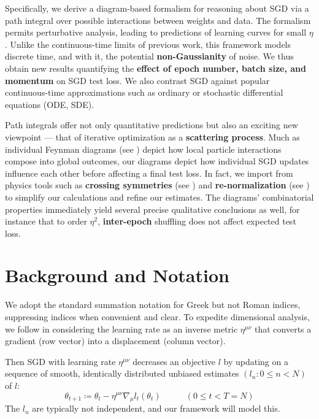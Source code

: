 \documentclass{article}
\begin{document}
    Specifically, we derive a diagram-based formalism for reasoning about SGD
    via a path integral over possible interactions between weights and data.
    The formalism permits perturbative analysis, leading to predictions of
    learning curves for small $\eta$.  Unlike the continuous-time limits of
    previous work, this framework models discrete time, and with it, the
    potential {\bf non-Gaussianity} of noise.  We thus obtain new results
    quantifying the {\bf effect of epoch number, batch size, and momentum} on
    SGD test loss.  We also contrast SGD against popular continuous-time
    approximations such as ordinary or stochastic differential equations (ODE,
    SDE).
    
    Path integrals offer not only quantitative predictions but also an exciting
    new viewpoint --- that of iterative optimization as a {\bf scattering
    process}.  Much as individual Feynman diagrams (see \citet{dy49a}) depict
    how local particle interactions compose into global outcomes, our diagrams
    depict how individual SGD updates influence each other before affecting a
    final test loss.  In fact, we import from physics tools such as {\bf
    crossing symmetries} (see \citet{dy49b}) and {\bf re-normalization} (see
    \citet{ge54}) to simplify our calculations and refine our estimates.
    The diagrams' combinatorial properties immediately yield several precise
    qualitative conclusions as well, for instance that to order $\eta^2$, {\bf
    inter-epoch} shuffling does not affect expected test loss.


\section{Background and Notation}

    We adopt the standard summation notation for Greek but not Roman indices,
    suppressing indices when convenient and clear.  To expedite dimensional
    analysis, we follow \cite{bo13} in considering the learning rate as an
    inverse metric $\eta^{\mu\nu}$ that converts a gradient (row vector) into a
    displacement (column vector).

    Then SGD with learning rate $\eta^{\mu\nu}$ decreases an objective $l$ by
    updating on a sequence of smooth, identically distributed unbiased
    estimates $(l_n: 0\leq n<N)$ of $l$:
    \begin{equation}\label{eq:sgdstep} \theta_{t+1} \coloneqq \theta_t -
        \eta^{\mu\nu} \nabla_\mu l_t(\theta_t)~~~~~~~~~~~~~(0\leq t<T=N)
    \end{equation}
    The $l_n$ are typically not independent, and our framework will model this.
\end{document}
